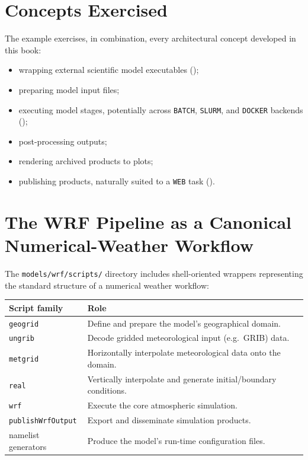 \section{Concepts Exercised}

The example exercises, in combination, every architectural concept developed
in this book:

\begin{itemize}[leftmargin=1.4em]
  \item wrapping external scientific model executables
    ();
  \item preparing model input files;
  \item executing model stages, potentially across \texttt{BATCH},
    \texttt{SLURM}, and \texttt{DOCKER} backends ();
  \item post-processing outputs;
  \item rendering archived products to plots;
  \item publishing products, naturally suited to a \texttt{WEB} task
    ().
\end{itemize}

\section{The WRF Pipeline as a Canonical Numerical-Weather Workflow}

The \texttt{models/wrf/scripts/} directory includes shell-oriented wrappers
representing the standard structure of a numerical weather workflow:

\begin{center}
\begin{tabular}{@{}ll@{}}
\toprule
\textbf{Script family} & \textbf{Role} \\
\midrule
\texttt{geogrid}  & Define and prepare the model's geographical domain. \\
\texttt{ungrib}   & Decode gridded meteorological input (e.g.\ GRIB) data. \\
\texttt{metgrid}  & Horizontally interpolate meteorological data onto the domain. \\
\texttt{real}     & Vertically interpolate and generate initial/boundary conditions. \\
\texttt{wrf}      & Execute the core atmospheric simulation. \\
\texttt{publishWrfOutput} & Export and disseminate simulation products. \\
namelist generators & Produce the model's run-time configuration files. \\
\bottomrule
\end{tabular}
\end{center}

